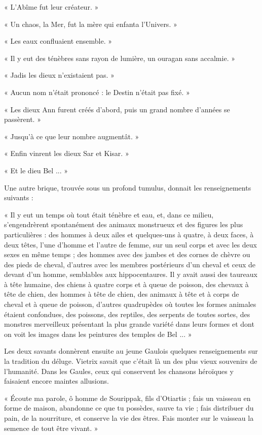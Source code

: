 \documentclass[a4paper, 11pt, oneside, polutonikogreek, french]{article}
\begin{document}
« L'Abîme fut leur créateur. »

« Un chaos, la Mer, fut la mère qui enfanta l'Univers. »

« Les eaux confluaient ensemble. »

« Il y eut des ténèbres sans rayon de lumière, un ouragan sans accalmie. »

« Jadis les dieux n'existaient pas. »

« Aucun nom n'était prononcé : le Destin n'était pas fixé. »

« Les dieux Ann furent créés d'abord, puis un grand nombre d'années se passèrent. »

« Jusqu'à ce que leur nombre augmentât. »

« Enfin vinrent les dieux Sar et Kisar. »

« Et le dieu Bel ... »

Une autre brique, trouvée sous un profond tumulus, donnait les renseignements suivants :

« Il y eut un temps où tout était ténèbre et eau, et, dans ce milieu, s'engendrèrent spontanément des animaux monstrueux et des figures les plus particulières : des hommes à deux ailes et quelques-uns à quatre, à deux faces, à deux têtes, l'une d'homme et l'autre de femme, sur un seul corps et avec les deux sexes en même temps ; des hommes avec des jambes et des cornes de chèvre ou des pieds de cheval, d'autres avec les membres postérieurs d'un cheval et ceux de devant d'un homme, semblables aux hippocentaures. Il y avait aussi des taureaux à tête humaine, des chiens à quatre corps et à queue de poisson, des chevaux à tête de chien, des hommes à tête de chien, des animaux à tête et à corps de cheval et à queue de poisson, d'autres quadrupèdes où toutes les formes animales étaient confondues, des poissons, des reptiles, des serpents de toutes sortes, des monstres merveilleux présentant la plus grande variété dans leurs formes et dont on voit les images dans les peintures des temples de Bel ... »

\centerline{\EightStarTaper}
\centerline{\EightStarTaper\EightStarTaper}
\bigskip

Les deux savants donnèrent ensuite au jeune Gaulois quelques renseignements sur la tradition du déluge. Vietrix savait que c'était là un des plus vieux souvenirs de l'humanité. Dans les Gaules, ceux qui conservent les chansons héroïques y faisaient encore maintes allusions.

« Écoute ma parole, ô homme de Sourippak, fils d'Otiartis ; fais un vaisseau en forme de maison, abandonne ce que tu possèdes, sauve ta vie ; fais distribuer du pain, de la nourriture, et conserve la vie des êtres. Fais monter sur le vaisseau la semence de tout être vivant. »
\end{document}

